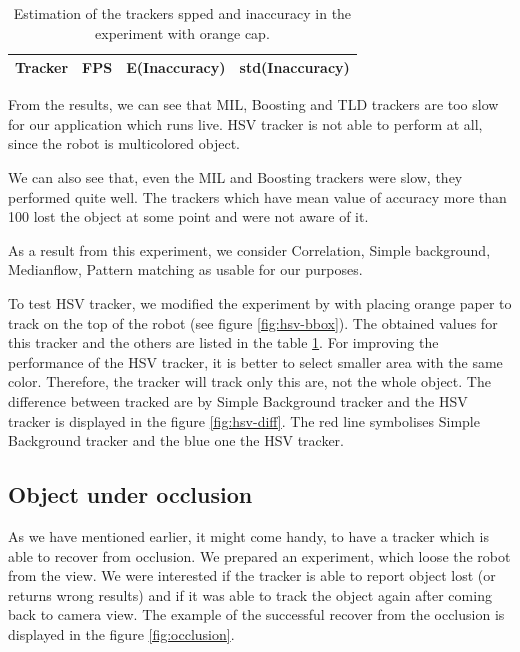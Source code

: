 \begin{table}
\centering
\begin{tabular}{l|l|l|l}
Tracker	& FPS & E(Inaccuracy) & std(Inaccuracy) \\
\hline

\end{tabular}
\caption{Estimation of the trackers spped and inaccuracy in the experiment with orange cap.}
\label{table:hsv}
\end{table}

From the results, we can see that MIL, Boosting and TLD trackers are too slow
for our application which runs live. HSV tracker is not able to perform at
all, since the robot is multicolored object.

We can also see that, even the MIL and Boosting trackers were slow, they
performed quite well. The trackers which have mean value of accuracy more than
100 lost the object at some point and were not aware of it.

As a result from this experiment, we consider Correlation, Simple background,
Medianflow, Pattern matching as usable for our purposes.

To test HSV tracker, we modified the experiment by with placing orange paper to
track on the top of the robot (see figure \ref{fig:hsv-bbox}). The obtained
values for this tracker and the others are listed in the table \ref{table:hsv}.
For improving the performance of the HSV tracker, it is better to select
smaller area with the same color. Therefore, the tracker will track only this
are, not the whole object. The difference between tracked are by Simple
Background tracker and the HSV tracker is displayed in the figure
\ref{fig:hsv-diff}. The red line symbolises Simple Background tracker and the
blue one the HSV tracker.

\subsection{Object under occlusion}

As we have mentioned earlier, it might come handy, to have a tracker which is
able to recover from occlusion. We prepared an experiment, which loose the
robot from the view. We were interested if the tracker is able to report object
lost (or returns wrong results) and if it was able to track the object again
after coming back to camera view. The example of the successful recover from
the occlusion is displayed in the figure \ref{fig:occlusion}.


